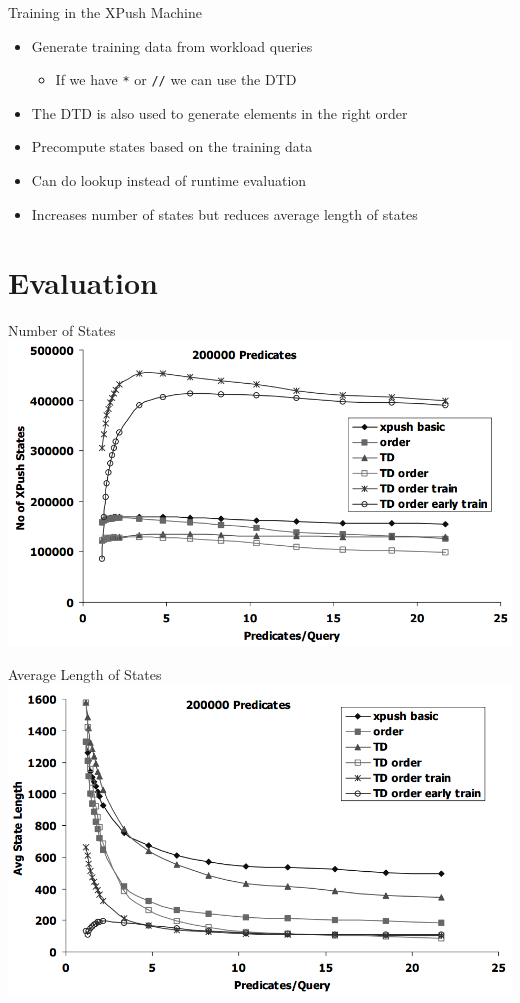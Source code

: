 \documentclass[mathserif,serif]{beamer}
\begin{document}
\begin{frame}{Training in the XPush Machine}
  \begin{itemize}
    \item Generate training data from workload queries
    \begin{itemize}
      \item If we have \texttt{*} or \texttt{//} we can use the DTD
    \end{itemize}
    \item The DTD is also used to generate elements in the right order
    \item Precompute states based on the training data
    \item Can do lookup instead of runtime evaluation 
    \item Increases number of states but reduces average length of states
  \end{itemize}
\end{frame}

\section{Evaluation}
\begin{frame}{Number of States}
  \includegraphics[width=\textwidth]{states}
\end{frame}

\begin{frame}{Average Length of States}
  \includegraphics[width=\textwidth]{avglen}
\end{frame}
\end{document}
